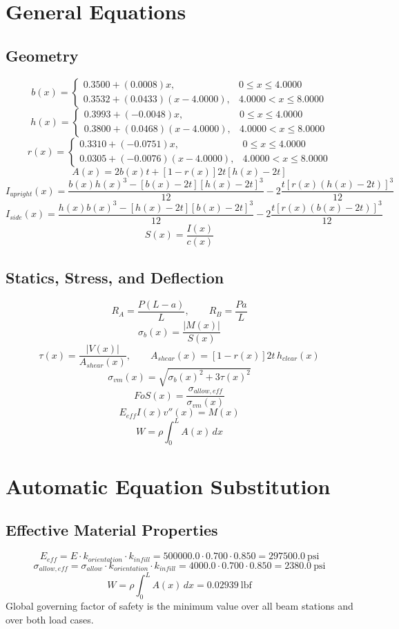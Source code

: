 \documentclass[11pt]{article}
\begin{document}
\section*{General Equations}
\subsection*{Geometry}
\[
b(x)=\begin{cases}0.3500 + (0.0008)x, & 0 \le x \le 4.0000\\0.3532 + (0.0433)(x-4.0000), & 4.0000 < x \le 8.0000\end{cases}
\]
\[
h(x)=\begin{cases}0.3993 + (-0.0048)x, & 0 \le x \le 4.0000\\0.3800 + (0.0468)(x-4.0000), & 4.0000 < x \le 8.0000\end{cases}
\]
\[
r(x)=\begin{cases}0.3310 + (-0.0751)x, & 0 \le x \le 4.0000\\0.0305 + (-0.0076)(x-4.0000), & 4.0000 < x \le 8.0000\end{cases}
\]
\[
A(x)=2b(x)t+[1-r(x)]2t[h(x)-2t]
\]
\[
I_{upright}(x)=\frac{b(x)h(x)^3-[b(x)-2t][h(x)-2t]^3}{12}-2\frac{t[r(x)(h(x)-2t)]^3}{12}
\]
\[
I_{side}(x)=\frac{h(x)b(x)^3-[h(x)-2t][b(x)-2t]^3}{12}-2\frac{t[r(x)(b(x)-2t)]^3}{12}
\]
\[
S(x)=\frac{I(x)}{c(x)}
\]

\subsection*{Statics, Stress, and Deflection}
\[
R_A=\frac{P(L-a)}{L}, \qquad R_B=\frac{Pa}{L}
\]
\[
\sigma_b(x)=\frac{|M(x)|}{S(x)}
\]
\[
\tau(x)=\frac{|V(x)|}{A_{shear}(x)}, \qquad A_{shear}(x)=[1-r(x)]2t\,h_{clear}(x)
\]
\[
\sigma_{vm}(x)=\sqrt{\sigma_b(x)^2+3\tau(x)^2}
\]
\[
FoS(x)=\frac{\sigma_{allow,eff}}{\sigma_{vm}(x)}
\]
\[
E_{eff}I(x)v''(x)=M(x)
\]
\[
W=\rho\int_0^L A(x)\,dx
\]

\section*{Automatic Equation Substitution}
\subsection*{Effective Material Properties}
\[E_{eff} = E \cdot k_{orientation} \cdot k_{infill} = 500000.0 \cdot 0.700 \cdot 0.850 = 297500.0\ \mathrm{psi}\]
\[\sigma_{allow,eff} = \sigma_{allow} \cdot k_{orientation} \cdot k_{infill} = 4000.0 \cdot 0.700 \cdot 0.850 = 2380.0\ \mathrm{psi}\]
\[W = \rho \int_0^L A(x)\,dx = 0.02939\ \mathrm{lbf}\]
Global governing factor of safety is the minimum value over all beam stations and over both load cases.
\end{document}
